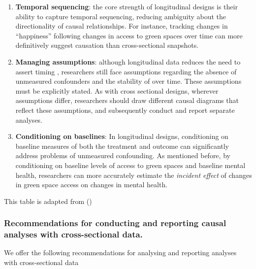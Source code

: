 \documentclass[
  singlecolumn]{article}
\begin{document}
\begin{enumerate}
\def\labelenumi{\arabic{enumi}.}
\item
  \textbf{Temporal sequencing}: the core strength of longitudinal
  designs is their ability to capture temporal sequencing, reducing
  ambiguity about the directionality of causal relationships. For
  instance, tracking changes in ``happiness'' following changes in
  access to green spaces over time can more definitively suggest
  causation than cross-sectional snapshots.
\item
  \textbf{Managing assumptions}: although longitudinal data reduces the
  need to assert timing , researchers still face assumptions regarding
  the absence of unmeasured confounders and the stability of over time.
  These assumptions must be explicitly stated. As with cross sectional
  designs, wherever assumptions differ, researchers should draw
  different causal diagrams that reflect these assumptions, and
  subsequently conduct and report separate analyses.
\item
  \textbf{Conditioning on baselines}: In longitudinal designs,
  conditioning on baseline measures of both the treatment and outcome
  can significantly address problems of unmeasured confounding. As
  mentioned before, by conditioning on baseline levels of access to
  green spaces and baseline mental health, researchers can more
  accurately estimate the \emph{incident effect} of changes in green
  space access on changes in mental health.
\end{enumerate}

\begin{table}

\caption{\label{tbl-lg}This table is adapted from
()}

\centering{

\examplelongitudinal

}

\end{table}%

\subsubsection{Recommendations for conducting and reporting causal
analyses with cross-sectional
data.}\label{recommendations-for-conducting-and-reporting-causal-analyses-with-cross-sectional-data.-1}

We offer the following recommendations for analysing and reporting
analyses with cross-sectional data
\end{document}
